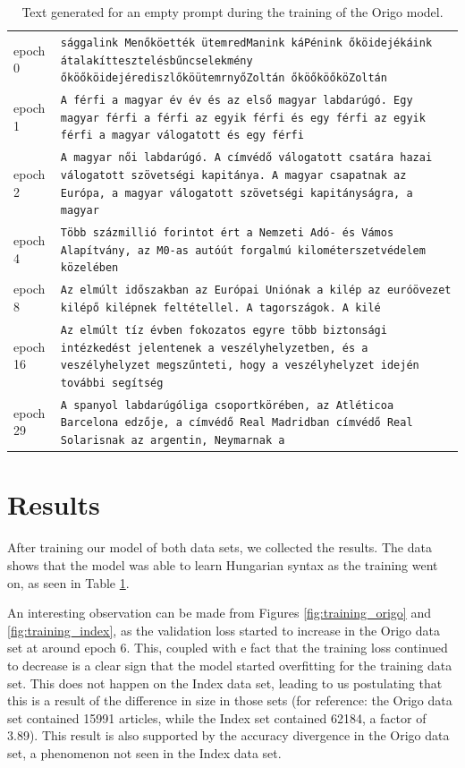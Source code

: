 \documentclass[journal]{IEEEtai}
\begin{document}
\def\myrow#1#2{#1 & {\tt #2} \\}
\begin{table}
\centering
\begin{tabular}{lp{12cm}}
\myrow{epoch 0}{sággalink Menőköették ütemredManink káPénink őköidejékáink átalakíttesztelésbűncselekmény őköőköidejérediszlőköütemrnyőZoltán őköőköőköZoltán}
\myrow{epoch 1}{A férfi a magyar év év és az első magyar labdarúgó. Egy magyar férfi a férfi az egyik férfi és egy férfi az egyik férfi a magyar válogatott és egy férfi}
\myrow{epoch 2}{A magyar női labdarúgó. A címvédő válogatott csatára hazai válogatott szövetségi kapitánya. A magyar csapatnak az Európa, a magyar válogatott szövetségi kapitányságra, a magyar}
\myrow{epoch 4}{Több százmillió forintot ért a Nemzeti Adó- és Vámos Alapítvány, az M0-as autóút forgalmú kilométerszetvédelem közelében}
\myrow{epoch 8}{Az elmúlt időszakban az Európai Uniónak a kilép az euróövezet kilépő kilépnek feltétellel. A tagországok. A kilé}
\myrow{epoch 16}{Az elmúlt tíz évben fokozatos egyre több biztonsági intézkedést jelentenek a veszélyhelyzetben, és a veszélyhelyzet megszűnteti, hogy a veszélyhelyzet idején további segítség}
\myrow{epoch 29}{A spanyol labdarúgóliga csoportkörében, az Atléticoa Barcelona edzője, a címvédő Real Madridban címvédő Real Solarisnak az argentin, Neymarnak a}
\end{tabular}
\caption{Text generated for an empty prompt during the training of the Origo model.}
\label{tab:training_origo}
\end{table}

\section{Results}
After training our model of both data sets, we collected the results. The data shows that the model was able to learn Hungarian syntax as the training went on, as seen in Table \ref{tab:training_origo}. 

An interesting observation can be made from Figures \ref{fig:training_origo} and \ref{fig:training_index}, as the validation loss started to increase in the Origo data set at around epoch 6. This, coupled with e fact that the training loss continued to decrease is a clear sign that the model started overfitting for the training data set. This does not happen on the Index data set, leading to us postulating that this is a result of the difference in size in those sets (for reference: the Origo data set contained 15991 articles, while the Index set contained 62184, a factor of 3.89). This result is also supported by the accuracy divergence in the Origo data set, a phenomenon not seen in the Index data set.
\end{document}
